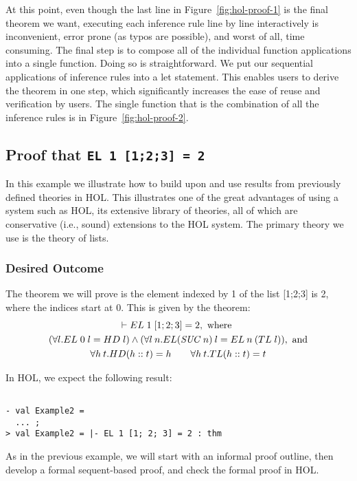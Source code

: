 At this point, even though the last line in
Figure~\ref{fig:hol-proof-1} is the final theorem we want, executing
each inference rule line by line interactively is inconvenient, error
prone (as typos are possible), and worst of all, time consuming. The
final step is to compose all of the individual function applications
into a single function. Doing so is straightforward. We put our
sequential applications of inference rules into a let statement. This
enables users to derive the theorem in one step, which significantly
increases the ease of reuse and verification by users.  The single
function that is the combination of all the inference rules is in
Figure~\ref{fig:hol-proof-2}.

\subsection{Proof that \textbf{\texttt{EL 1 [1;2;3] = 2}}}
\label{sec:list-proof}

In this example we illustrate how to build upon and use results from
previously defined theories in HOL. This illustrates one of the great
advantages of using a system such as HOL, its extensive library of
theories, all of which are conservative (i.e., sound) extensions to
the HOL system.  The primary theory we use is the theory of lists.

\subsubsection{Desired Outcome}
The theorem we will prove is the element indexed by 1 of the list
[1;2;3] is 2, where the indices start at 0. This is given by the
theorem:
\begin{gather*}
  \vdash {EL \;1 \;[1;2;3] = 2}, \text{ where }\\
  (\forall l.EL \; 0 \;l = HD \;l) \wedge (\forall
  l\:n.EL(\mathit{SUC}\:n)\:l = EL\:n\:(TL\;l)), \text{ and}\\
  \forall h\:t.HD (h::t) = h \qquad \forall h\:t.TL(h::t) = t
\end{gather*}

In HOL, we expect the following result:
\begin{session}
\begin{verbatim}

- val Example2 =
  ... ;
> val Example2 = |- EL 1 [1; 2; 3] = 2 : thm
\end{verbatim}
\end{session}

As in the previous example, we will start with an informal proof
outline, then develop a formal sequent-based proof, and check the
formal proof in HOL.

